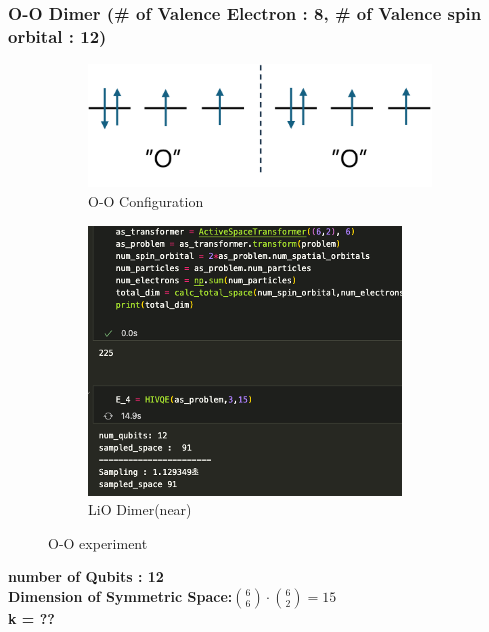 \documentclass[11pt]{article}
\begin{document}
\subsubsection{O-O Dimer (\# of Valence Electron : 8, \# of Valence spin orbital : 12)}
\begin{figure}[H]
  \centering
  \begin{subfigure}[b]{0.5\textwidth}
    \includegraphics[width=\textwidth]{fig/OO_conf.png}
    \caption{O-O Configuration}
    \label{fig:first}
  \end{subfigure}
  \hfill
  \vrule width 1pt  %
  \hfill
  \begin{subfigure}[b]{0.4\textwidth}
    \includegraphics[width=\textwidth]{fig/OO_exp.png}
    \caption{LiO Dimer(near)}
    \label{fig:second}
  \end{subfigure}
  \caption{O-O experiment}
  \label{fig:two_figures_side_by_side}
\end{figure}
\begin{center}
\textbf{number of Qubits : 12}\\
\textbf{Dimension of Symmetric Space:\(\binom{6}{6}\cdot\binom{6}{2}=15\)}\\
\textbf{k = ??}
\end{center}
\end{document}
